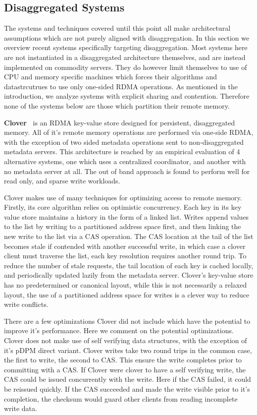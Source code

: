 

\subsection{Disaggregated Systems}

The systems and techniques covered until this point all make architectural
assumptions which are not purely aligned with disaggregation. In this section we
overview recent systems specifically targeting disaggregation. Most systems here
are not instantiated in a disaggregated architecture themselves, and are instead
implemented on commodity servers. They do however limit themselves to use of CPU
and memory specific machines which forces their algorithms and datastrcutrues to
use only one-sided RDMA operations. As mentioned in the introduction, we analyze
systems with explicit sharing and contention. Therefore none of the systems
below are those which partition their remote memory.

\textbf{Clover~\cite{clover}}
is an RDMA key-value store designed for persistent, disaggregated memory. All
of it's remote memory operations are performed via one-side RDMA, with the
exception of two sided metadata operations sent to non-disaggregated metadata
servers. This architecture is reached by an empirical evaluation of 4
alternative systems, one which uses a centralized coordinator, and another with
no metadata server at all. The out of band approach is found to perform well for
read only, and sparse write workloads. 

Clover makes use of many techniques for optimizing access to remote memory.
Firstly, its core algorithm relies on optimistic concurrency. Each key in its
key value store maintains a history in the form of a linked list. Writes append
values to the list by writing to a partitioned address space first, and then
linking the new write to the list via a CAS operation. The CAS location at the
tail of the list becomes stale if contended with another successful write, in
which case a clover client must traverse the list, each key resolution requires
another round trip. To reduce the number of stale requests, the tail location of
each key is cached locally, and periodically updated lazily from the metadata
server. Clover's key-value store has no predetermined or canonical layout, while
this is not necessarily a relaxed layout, the use of a partitioned address space
for writes is a clever way to reduce write conflicts.

There are a few optimizations Clover did not include which have the potential to
improve it's performance. Here we comment on the potential optimizations. Clover
does not make use of self verifying data structures, with the exception of it's
pDPM direct variant. Clover writes take two round trips in the common case, the
first to write, the second to CAS. This ensure the write completes prior to
committing with a CAS.  If Clover were clover to have a self verifying write,
the CAS could be issued concurrently with the write. Here if the CAS failed, it
could be reissued quickly. If the CAS succeeded and made the write visible prior
to it's completion, the checksum would guard other clients from reading
incomplete write data. 

